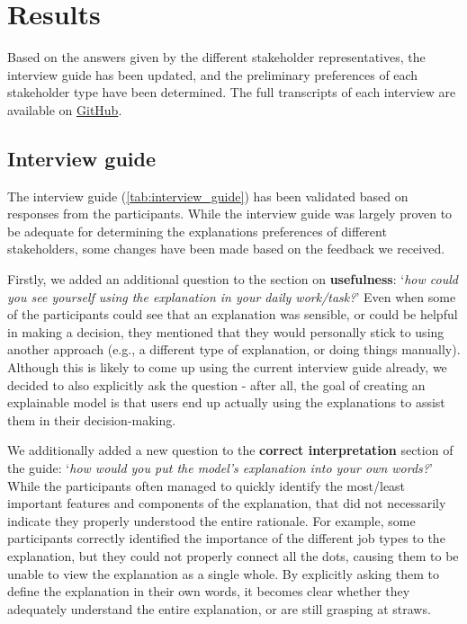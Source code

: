 \section{Results}
Based on the answers given by the different stakeholder representatives, the interview guide has been updated, and the preliminary preferences of each stakeholder type have been determined. The full transcripts of each interview are available on \href{}{GitHub}. 

\subsection{Interview guide}

The interview guide (\cref{tab:interview_guide}) has been validated based on responses from the participants. While the interview guide was largely proven to be adequate for determining the explanations preferences of different stakeholders, some changes have been made based on the feedback we received. 

Firstly, we added an additional question to the section on \textbf{usefulness}: `\textit{how could you see yourself using the explanation in your daily work/task?}' Even when some of the participants could see that an explanation was sensible, or could be helpful in making a decision, they mentioned that they would personally stick to using another approach (e.g., a different type of explanation, or doing things manually). Although this is likely to come up using the current interview guide already, we decided to also explicitly ask the question - after all, the goal of creating an explainable model is that users end up actually using the explanations to assist them in their decision-making. 

We additionally added a new question to the \textbf{correct interpretation} section of the guide: `\textit{how would you put the model's explanation into your own words?}' While the participants often managed to quickly identify the most/least important features and components of the explanation, that did not necessarily indicate they properly understood the entire rationale. For example, some participants correctly identified the importance of the different job types to the explanation, but they could not properly connect all the dots, causing them to be unable to view the explanation as a single whole. By explicitly asking them to define the explanation in their own words, it becomes clear whether they adequately understand the entire explanation, or are still grasping at straws. 


